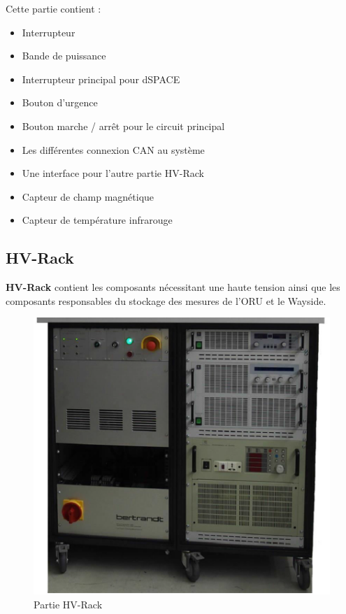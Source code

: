 \noindent Cette partie contient : 

\begin{itemize}
	\item Interrupteur
	\item Bande de puissance
	\item Interrupteur principal pour dSPACE
	\item Bouton d’urgence
	\item Bouton marche / arrêt pour le circuit principal
	\item Les différentes connexion CAN au système
	\item Une interface pour l’autre partie HV-Rack
	\item Capteur de champ magnétique
	\item Capteur de température infrarouge
\end{itemize}

\subsection{HV-Rack}

\textbf{HV-Rack} contient les composants nécessitant une haute tension ainsi que les composants responsables du stockage des mesures de l’ORU et le Wayside.

\begin{figure}[H]
 \centering
 \includegraphics[scale=1]{images/hv_rack}
 \caption{Partie HV-Rack}
\end{figure}

